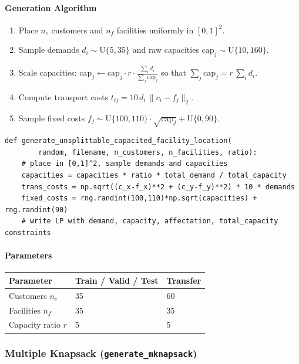 \paragraph{Generation Algorithm}

\begin{enumerate}
    \item Place $n_c$ customers and $n_f$ facilities uniformly in $[0,1]^2$.
    \item Sample demands $d_i \sim \mathrm{U}\{5,35\}$ and raw capacities $\mathrm{cap}_j \sim \mathrm{U}\{10,160\}$.
    \item Scale capacities: $\mathrm{cap}_j \leftarrow \mathrm{cap}_j \cdot r \cdot \frac{\sum_i d_i}{\sum_j \mathrm{cap}_j}$ so that $\sum_j \mathrm{cap}_j = r\,\sum_i d_i$.
    \item Compute transport costs $t_{ij} = 10\,d_i\,\|c_i - f_j\|_2$.
    \item Sample fixed costs $f_j \sim \mathrm{U}\{100,110\}\cdot\sqrt{\mathrm{cap}_j} + \mathrm{U}\{0,90\}$.
\end{enumerate}

\begin{lstlisting}
def generate_unsplittable_capacited_facility_location(
        random, filename, n_customers, n_facilities, ratio):
    # place in [0,1]^2, sample demands and capacities
    capacities = capacities * ratio * total_demand / total_capacity
    trans_costs = np.sqrt((c_x-f_x)**2 + (c_y-f_y)**2) * 10 * demands
    fixed_costs = rng.randint(100,110)*np.sqrt(capacities) + rng.randint(90)
    # write LP with demand, capacity, affectation, total_capacity constraints
\end{lstlisting}

\paragraph{Parameters}

\begin{tabular}{lll}
\toprule
Parameter & Train / Valid / Test & Transfer \\
\midrule
Customers $n_c$    & 35 & 60 \\
Facilities $n_f$   & 35 & 35 \\
Capacity ratio $r$ & 5  & 5  \\
\bottomrule
\end{tabular}

\subsubsection{Multiple Knapsack (\texttt{generate\_mknapsack})}

